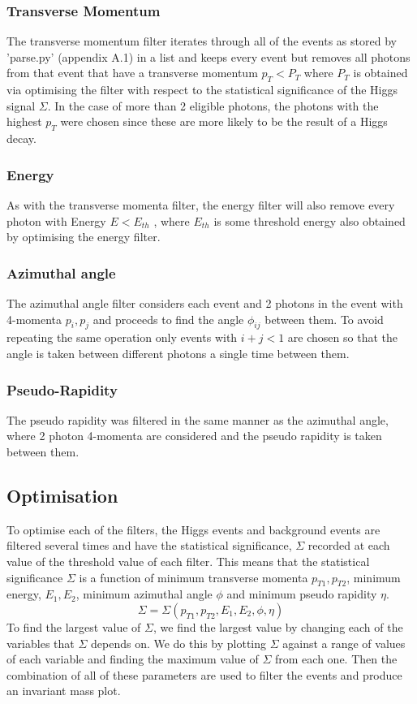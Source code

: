 \documentclass{article}
\begin{document}
\subsubsection{Transverse Momentum}
The transverse momentum filter iterates through all of the events as stored by 'parse.py' (appendix A.1) in a list and keeps every event but removes all photons from that event that have a transverse momentum $p_T < P_T$ where $P_T$ is obtained via optimising the filter with respect to the statistical significance of the Higgs signal $\Sigma$. 
In the case of more than 2 eligible photons, the photons with the highest $p_T$ were chosen since these are more likely to be the result of a Higgs decay. 
\subsubsection{Energy}
As with the transverse momenta filter, the energy filter will also remove every photon with Energy $E< E_{th}$ , where $E_{th}$ is some threshold energy also obtained by optimising the energy filter. 
\subsubsection{Azimuthal angle}
The azimuthal angle filter considers each event and 2 photons in the event with 4-momenta $p_i, p_j$ and proceeds to find the angle $\phi_{ij}$ between them. To avoid repeating the same operation only events with $i+j<1$ are chosen so that the angle is taken between different photons a single time between them.
\subsubsection{Pseudo-Rapidity}
The pseudo rapidity was filtered in the same manner as the azimuthal angle, where 2 photon 4-momenta are considered and the pseudo rapidity is taken between them.
\subsection{Optimisation}
To optimise each of the filters, the Higgs events and background events are filtered several times and have the statistical significance, $\Sigma$ recorded at each value of the threshold value of each filter. This means that the statistical significance $\Sigma$ is a function of minimum transverse momenta $p_{T1}, p_{T2}$, minimum energy, $E_1, E_2$, minimum azimuthal angle $\phi$ and minimum pseudo rapidity $\eta$.
\begin{equation}
\Sigma = \Sigma(p_{T1}, p_{T2}, E_1, E_2, \phi, \eta)
\end{equation}
To find the largest value of $\Sigma$, we find the largest value by changing each of the variables that $\Sigma$ depends on. We do this by plotting $\Sigma$ against a range of values of each variable and finding the maximum value of $\Sigma$ from each one. Then the combination of all of these parameters are used to filter the events and produce an invariant mass plot.
\end{document}
